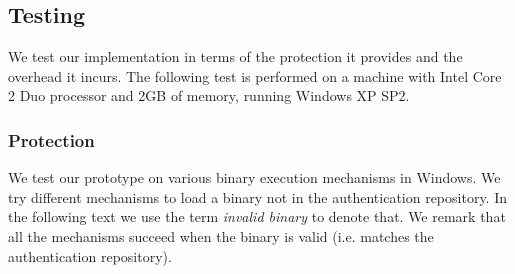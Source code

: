 \subsection{Testing}
\label{sec:binauth-testing}

We test our implementation in terms of the protection it provides
and the overhead it incurs.
The following test is performed on a machine with Intel Core 2 Duo
processor and 2GB of memory, running Windows XP SP2.

\subsubsection{Protection}

We test our prototype on various binary execution mechanisms in Windows.
We try different mechanisms to load a binary not in the
authentication repository.
In the following text we use the term {\em invalid binary} to denote
that.
We remark that all the mechanisms succeed when the binary is valid (i.e.
matches the authentication repository).


